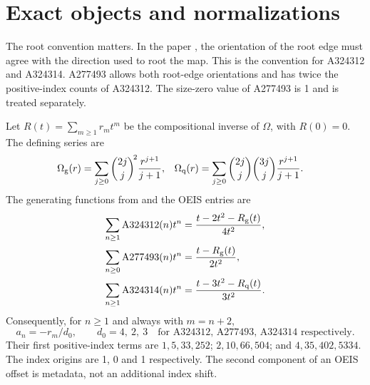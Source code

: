 \documentclass[11pt]{article}
\numberwithin{equation}{section}
\theoremstyle{remark}\newtheorem{remark}[theorem]{Remark}
\begin{document}
\section{Exact objects and normalizations}\label{peo:sec:objects}
The root convention matters. In the paper \cite{BMEP}, the orientation of the root edge must agree with the direction used to root the map. This is the convention for A324312 and A324314. A277493 allows both root-edge orientations and has twice the positive-index counts of A324312. The size-zero value of A277493 is 1 and is treated separately.

Let $R(t)=\sum_{m\ge1}r_mt^m$ be the compositional inverse of $\Omega$, with $R(0)=0$. The defining series are
\begin{align}
 \Omega_{\rm g}(r)&=\sum_{j\ge0}\binom{2j}{j}^{\!2}\frac{r^{j+1}}{j+1},
 &\Omega_{\rm q}(r)&=\sum_{j\ge0}\binom{2j}{j}\binom{3j}{j}\frac{r^{j+1}}{j+1}.
 \label{peo:eq:Omega}
\end{align}
The generating functions from \cite[Theorems 1.1--1.2]{BMEP} and the OEIS entries are
\begin{align}
 \sum_{n\ge1}\mathrm{A324312}(n)t^n&=\frac{t-2t^2-R_{\rm g}(t)}{4t^2},\nonumber\\
 \sum_{n\ge0}\mathrm{A277493}(n)t^n&=\frac{t-R_{\rm g}(t)}{2t^2},\label{peo:eq:seqgfs}\\
 \sum_{n\ge1}\mathrm{A324314}(n)t^n&=\frac{t-3t^2-R_{\rm q}(t)}{3t^2}.\nonumber
\end{align}
Consequently, for $n\ge1$ and always with $m=n+2$,
\begin{equation}
 a_n=-r_m/d_0,\qquad
 d_0=4,\ 2,\ 3
 \quad\text{for A324312, A277493, A324314 respectively.}\label{peo:eq:shift}
\end{equation}
Their first positive-index terms are $1,5,33,252$; $2,10,66,504$; and $4,35,402,5334$. The index origins are 1, 0 and 1 respectively. The second component of an OEIS offset is metadata, not an additional index shift.
\end{document}
